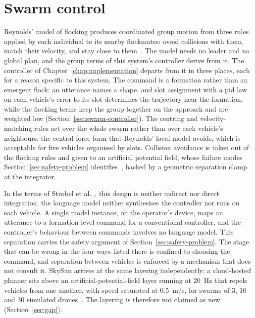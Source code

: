 \section{Swarm control}
\label{sec:swarm-control-sota}
Reynolds' model of flocking produces coordinated group motion from three rules applied by each
individual to its nearby flockmates: avoid collisions with them, match their velocity, and stay
close to them~\cite{reynolds1987}. The model needs no leader and no global plan, and the group terms
of this system's controller derive from it. The controller of Chapter~\ref{chap:implementation}
departs from it in three places, each for a reason specific to this system. The command is a
formation rather than an emergent flock: an utterance names a shape, and slot assignment with a
\gls{pid} law on each vehicle's error to its slot determines the trajectory near the formation,
while the flocking terms keep the group together on the approach and are weighted low
(Section~\ref{sec:swarm-controller}). The centring and velocity-matching rules act over the whole
swarm rather than over each vehicle's neighbours, the central-force form that Reynolds' local model
avoids, which is acceptable for five vehicles organised by slots. Collision avoidance is taken out
of the flocking rules and given to an artificial potential field, whose failure modes
Section~\ref{sec:safety-problem} identifies~\cite{koren1991}, backed by a geometric separation clamp
at the integrator.

In the terms of Strobel et al.~\cite{llm2swarm2024}, this design is neither indirect nor direct
integration: the language model neither synthesises the controller nor runs on each vehicle. A
single model instance, on the operator's device, maps an utterance to a formation-level command for a
conventional controller, and the controller's behaviour between commands involves no language model.
This separation carries the safety argument of Section~\ref{sec:safety-problem}. The stage that can
be wrong in the four ways listed there is confined to choosing the command, and separation between
vehicles is enforced by a mechanism that does not consult it. SkySim arrives at the same layering
independently: a cloud-hosted planner sits above an artificial-potential-field layer running at
20~Hz that repels vehicles from one another, with speed saturated at 0.5~m/s, for swarms of 3, 10
and 30 simulated drones~\cite{skysim2026}. The layering is therefore not claimed as new
(Section~\ref{sec:gap}).

